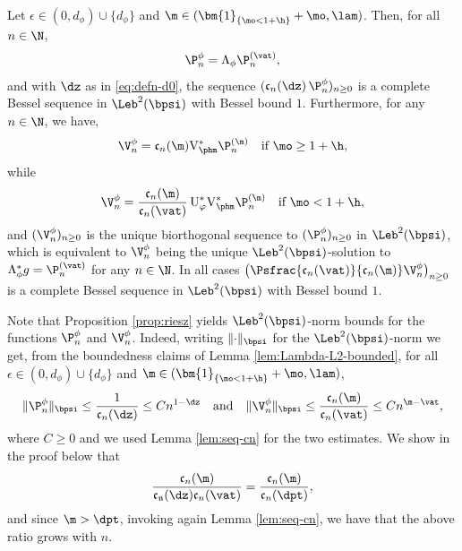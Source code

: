 \begin{proposition}
\label{prop:riesz}
Let $\epsilon \in (0,d_\phi) \cup \{d_\phi\}$ and $\m \in (\bm{1}_{\{\mo < 1+\h\}} + \mo ,\lam)$. Then,
for all $n \in \N$,
\begin{equation}
\label{eq:alt-V-n-0}
\P_n^\phi = \Lambda_{\phi} \P_n^{(\vat)},
\end{equation}
and with $\dz$ as in \eqref{eq:defn-d0}, the sequence $\left(\mathfrak{c}_n(\dz\right)\P_n^\phi)_{n \geq 0}$ is a complete Bessel sequence in $\Leb^2(\bpsi)$ with Bessel bound $1$. Furthermore, for any $n \in \N$, we have,
\begin{equation}
\label{eq:alt-V-n}
\V_n^\phi = \mathfrak{c}_n(\m) \mathrm{V}_{\phm}^*\P_n^{(\m)} \quad \mbox{if } \mo \geq 1+\h,
\end{equation}
while
\begin{equation*}
\V_n^\phi = \frac{\mathfrak{c}_n(\m)}{\mathfrak{c}_n(\vat)}\, {\mathrm{U}}_\varphi^* \mathrm{V}_{\phm}^*\P_n^{(\m)}
\quad \mbox{if } \mo < 1+\h,
\end{equation*}
and $(\V_n^\phi)_{n \geq 0}$ is the unique biorthogonal sequence to $(\P_n^\phi)_{n \geq 0}$ in $\Leb^2(\bpsi)$, which is equivalent to $\V_n^\phi$ being the unique $\Leb^2(\bpsi)$-solution to $\Lambda_\phi^* g = \P_n^{(\vat)}$ for any $n \in \N$. In all cases $\bigl(\Psfrac{\mathfrak{c}_n(\vat)}{\mathfrak{c}_n(\m)} \V_n^\phi\bigr)_{n \geq 0}$ is a complete Bessel sequence in $\Leb^2(\bpsi)$ with Bessel bound $1$.
\end{proposition}
\begin{remark}\label{rem:bounds}
Note that Proposition \ref{prop:riesz} yields $\Leb^2(\bpsi)$-norm bounds for the functions $\P_n^\phi$ and $\V_n^\phi$. Indeed, writing $\|{\cdot}\|_\bpsi$ for the $\Leb^2(\bpsi)$-norm we get, from the boundedness claims of Lemma \ref{lem:Lambda-L2-bounded}, for all $\epsilon \in (0,d_\phi) \cup \{d_\phi\}$ and $\m \in (\bm{1}_{\{\mo < 1+\h\}} + \mo,\lam)$,
\begin{equation*}
\|\P_n^\phi\|_\bpsi \leq \frac{1}{\mathfrak{c}_n(\dz)}\leq C n^{1-\dz} \quad \text{and} \quad \|\V_n^\phi\|_\bpsi \leq \frac{\mathfrak{c}_n(\m)}{\mathfrak{c}_n(\vat)}\leq C n^{\m-\vat},
\end{equation*}
where $C \ge 0$ and we used Lemma \ref{lem:seq-cn} for the two estimates.
We show in the proof below that
\begin{equation*}
\frac{\mathfrak{c}_n(\m)}{\mathfrak{c_n}(\dz)\mathfrak{c}_n(\vat)} = \frac{\mathfrak{c}_n(\m)}{\mathfrak{c}_n(\dpt)},
\end{equation*}
and since $\m > \dpt$, invoking again Lemma \ref{lem:seq-cn}, we have that the above ratio grows with $n$.
\end{remark}


